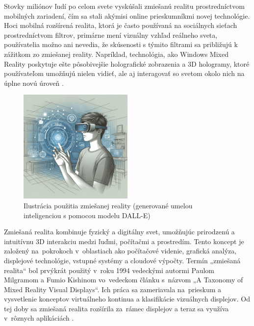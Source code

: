 Stovky miliónov ľudí po celom svete vyskúšali zmiešanú realitu prostredníctvom mobilných zariadení, čím sa stali akýmisi online prieskumníkmi novej technológie. Hoci mobilná rozšírená realita, ktorá je často používaná na sociálnych sieťach prostredníctvom filtrov,  primárne mení vizuálny vzhľad reálneho sveta, používatelia možno ani nevedia, že skúsenosti s týmito filtrami sa približujú k zážitkom zo zmiešanej reality. Napríklad, technológia, ako Windows Mixed Reality poskytuje ešte pôsobivejšie holografické zobrazenia a 3D hologramy, ktoré používateľom umožňujú nielen vidieť, ale aj interagovať so svetom okolo nich na úplne novú úroveň \cite{microsoft2023mixedreality}.



\begin{figure}[h]
  \centering
  \includegraphics[width=0.5\textwidth]{img/zmiesana_realita.png}
  \caption{Ilustrácia použitia zmiešanej reality (generované umelou inteligenciou s pomocou modelu DALL-E)}
  \label{fig:mix_real}
\end{figure}

Zmiešaná realita kombinuje fyzický a digitálny svet, umožňujúc prirodzenú a intuitívnu 3D interakciu medzi ľuďmi, počítačmi a prostredím. Tento koncept je založený na~pokrokoch v~oblastiach ako počítačové videnie, grafická analýza, displejové technológie, vstupné systémy a cloudové výpočty. Termín „zmiešaná realita“ bol prvýkrát použitý v~roku 1994 vedeckými autormi Paulom Milgramom a Fumio Kishinom vo~vedeckom článku s~názvom „A Taxonomy of Mixed Reality Visual Displays“. Ich práca sa zameriavala na~prieskum a vysvetlenie konceptov virtuálneho kontinua a klasifikácie vizuálnych displejov. Od tej doby sa zmiešaná realita rozšírila za~rámec displejov a teraz sa využíva v~rôznych aplikáciách \cite{milgram_kishino}. %

